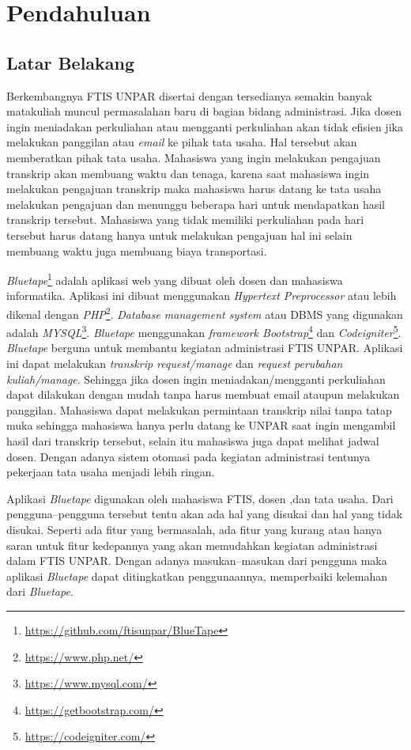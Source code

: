 \chapter{Pendahuluan}
\label{chap:intro}
   
\section{Latar Belakang}
\label{sec:label}
 Berkembangnya FTIS UNPAR disertai dengan tersedianya semakin banyak matakuliah muncul permasalahan baru di bagian bidang administrasi. Jika dosen ingin meniadakan perkuliahan atau mengganti perkuliahan akan tidak efisien jika melakukan panggilan atau \textit{email} ke pihak tata usaha. Hal tersebut akan memberatkan pihak tata usaha. Mahasiswa yang ingin melakukan pengajuan transkrip akan membuang waktu dan tenaga, karena saat mahasiswa ingin melakukan pengajuan transkrip maka mahasiswa harus datang ke tata usaha melakukan pengajuan dan menunggu beberapa hari untuk mendapatkan hasil transkrip tersebut. Mahasiswa yang tidak memiliki perkuliahan pada hari tersebut harus datang hanya untuk melakukan pengajuan hal ini selain membuang waktu juga membuang biaya transportasi.


\textit{Bluetape}\footnote{\label{ft:bluetape}\url{https://github.com/ftisunpar/BlueTape}} adalah aplikasi web yang dibuat oleh dosen dan mahasiswa informatika. Aplikasi ini dibuat menggunakan \textit{Hypertext Preprocessor} atau lebih dikenal dengan \textit{PHP}\footnote{\url{https://www.php.net/}}. \textit{Database management system} atau DBMS yang digunakan adalah \textit{MYSQL}\footnote{\url{https://www.mysql.com/}}.\textit{ Bluetape} menggunakan \textit{framework Bootstrap}\footnote{\url{https://getbootstrap.com/}} dan \textit{Codeigniter}\footnote{\url{https://codeigniter.com/}}. \textit{Bluetape} berguna untuk membantu kegiatan administrasi FTIS UNPAR. Aplikasi ini dapat melakukan \textit{transkrip request/manage} dan \textit{request perubahan kuliah/manage}. Sehingga jika dosen ingin meniadakan/mengganti perkuliahan dapat dilakukan dengan mudah tanpa harus membuat email ataupun melakukan panggilan. Mahasiswa dapat melakukan permintaan transkrip nilai tanpa tatap muka sehingga mahasiswa hanya perlu datang ke UNPAR saat ingin mengambil hasil dari transkrip tersebut, selain itu mahasiswa juga dapat melihat jadwal dosen. Dengan adanya sistem otomasi pada kegiatan administrasi tentunya pekerjaan tata usaha menjadi lebih ringan. 


Aplikasi \textit{Bluetape} digunakan oleh mahasiswa FTIS, dosen ,dan tata usaha. Dari pengguna--pengguna tersebut tentu akan ada hal yang disukai dan hal yang tidak disukai. Seperti ada fitur yang bermasalah, ada fitur yang kurang atau hanya saran untuk fitur kedepannya yang akan memudahkan kegiatan administrasi dalam FTIS UNPAR. Dengan adanya masukan--masukan dari pengguna maka aplikasi \textit{Bluetape} dapat ditingkatkan penggunaannya, memperbaiki kelemahan dari \textit{Bluetape}.

